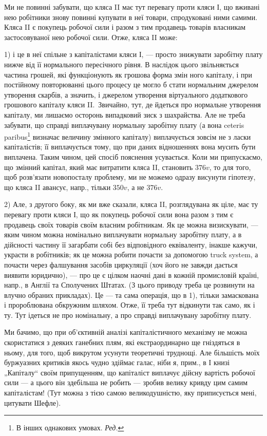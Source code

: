 Ми не повинні забувати, що кляса II має тут перевагу проти кляси І,
що вживані нею робітники знову повинні купувати в неї товари, спродуковані
ними самими. Кляса II є покупець робочої сили і разом з тим
продавець товарів власникам застосовуваної нею робочої сили. Отже,
кляса II може:

1) і це в неї спільне з капіталістами кляси І, — просто знижувати
заробітну плату нижче від її нормального пересічного рівня. В наслідок цього
звільняється частина грошей, які функціонують як грошова форма змін
ного капіталу, і при постійному повторюванні цього процесу це могло б
стати нормальним джерелом утворення скарбів, а значить, і джерелом
утворення віртуального додаткового грошового капіталу кляси II.~Звичайно,
тут, де йдеться про нормальне утворення капіталу, ми лишаємо
осторонь випадковий зиск з шахрайства. Але не треба забувати, що
справді виплачувану нормальну заробітну плату (а вона ceteris paribus\footnote*{
В інших однакових умовах. \emph{Ред.}
}
визначає величину змінного капіталу) виплачується зовсім не з ласки
капіталістів; її виплачується тому, що при даних відношеннях вона
мусить бути виплачена. Таким чином, цей спосіб пояснення усувається.
Коли ми припускаємо, що змінний капітал, який має витратити кляса II,
становить $376 v$, то для того, щоб розв’язати новопосталу проблему, ми
не можемо одразу висунути гіпотезу, що кляса II авансує, напр., тільки
$350 v$, а не $376 v$.

2) Але, з другого боку, як ми вже сказали, кляса II, розглядувана як
ціле, має ту перевагу проти кляси І, що як покупець робочої сили вона
разом з тим є продавець своїх товарів своїм власним робітникам. Як це
можна визискувати, — яким чином можна номінально виплачувати нормальну
заробітну плату, а в дійсності частину її загарбати собі без відповідного
еквіваленту, інакше кажучи, украсти в робітників; як це можна робити
почасти за допомогою truck system, а почасти через фалшування засобів
циркуляції (хоч його не завжди дається виявити юридично), — про
це є цілком наочні дані в кожній промисловій країні, напр., в Англії та
Сполучених Штатах. (З цього приводу треба це розвинути на влучно
обраних прикладах). Це — та сама операція, що в 1), тільки замаскована
і пророблювана обкружним шляхом. Отже, її треба тут відкинути так
само, як і ту. Тут ідеться не про номінальну, а про справді виплачувану
заробітну плату.

Ми бачимо, що при об’єктивній аналізі капіталістичного механізму не
можна скористатися з деяких ганебних плям, які екстраординарно ще
гніздяться в ньому, для того, щоб викрутом усунути теоретичні труднощі.
Але більшість моїх буржуазних критиків якось чудно здіймає галас, ніби
я, прим., в І книзі „Капіталу“ своїм припущенням, що капіталіст виплачує
дійсну вартість робочої сили — а цього він здебільша не робить —
зробив велику кривду цим самим капіталістам! (Тут можна з тією самою
великодушністю, яку приписується мені, цитувати Шефле).

